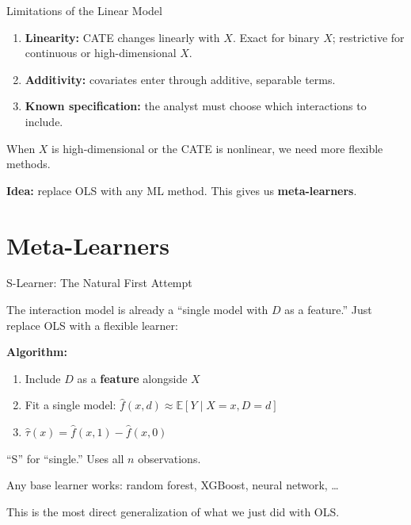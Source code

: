 \documentclass[aspectratio=169, 11pt]{beamer}
\newcommand{\E}{\mathbb{E}}
\begin{document}
\begin{frame}{Limitations of the Linear Model}
 
\begin{enumerate}
    \item \textbf{Linearity:} CATE changes linearly with $X$. Exact for binary $X$; restrictive for continuous or high-dimensional $X$.
 
    \bigskip
 
    \item \textbf{Additivity:} covariates enter through additive, separable terms.
 
    \bigskip
 
    \item \textbf{Known specification:} the analyst must choose which interactions to include.
\end{enumerate}
 
\bigskip
 
When $X$ is high-dimensional or the CATE is nonlinear, we need more flexible methods.
 
\bigskip
 
\textbf{Idea:} replace OLS with any ML method. This gives us \textbf{meta-learners}.
\end{frame}
 
 
\section{Meta-Learners}
 
\begin{frame}{S-Learner: The Natural First Attempt}
 
The interaction model is already a ``single model with $D$ as a feature.'' Just replace OLS with a flexible learner:
 
\bigskip
 
\textbf{Algorithm:}
\begin{enumerate}
    \item Include $D$ as a \textbf{feature} alongside $X$
    \item Fit a single model: $\hat{f}(x, d) \approx \E[Y \mid X = x, D = d]$
    \item $\hat{\tau}(x) = \hat{f}(x, 1) - \hat{f}(x, 0)$
\end{enumerate}
 
\bigskip
 
``S'' for ``single.'' Uses all $n$ observations.
 
\bigskip
 
Any base learner works: random forest, XGBoost, neural network, \ldots
 
\bigskip
 
This is the most direct generalization of what we just did with OLS.
\end{frame}
 
\end{document}
